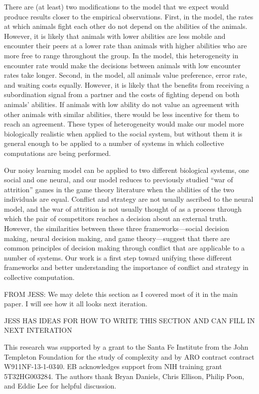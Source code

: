 \documentclass{pnastwo}
\begin{document}
\begin{article}
There are (at least) two modifications to the model that we expect would produce results closer to the empirical observations.  First, in the model, the rates at which animals fight each other do not depend on the abilities of the animals.  However, it is likely that animals with lower abilities are less mobile and encounter their peers at a lower rate than animals with higher abilities who are more free to range throughout the group.  In the model, this heterogeneity in encounter rate would make the decisions between animals with low encounter rates take longer.  Second, in the model, all animals value preference, error rate, and waiting costs equally.  However, it is likely that the benefits from receiving a subordination signal from a partner and the costs of fighting depend on both animals' abilities.  If animals with low ability  do not value an agreement with other animals with similar abilities, there would be less incentive for them to reach an agreement.  These types of heterogeneity would make our model more biologically realistic when applied to the social system, but without them it is general enough to be applied to a number of systems in which collective computations are being performed.  

Our noisy learning model can be applied to two different biological systems, one social and one neural, and our model reduces to previously studied ``war of attrition'' games in the game theory literature when the abilities of the two individuals are equal.  Conflict and strategy are not usually ascribed to the neural model, and the war of attrition is not usually thought of as a process through which the pair of competitors reaches a decision about an external truth.  However, the similarities between these three frameworks---social decision making, neural decision making, and game theory---suggest that there are common principles of decision making through conflict that are applicable to a number of systems.  Our work is a first step toward unifying these different frameworks and better understanding the importance of conflict and strategy in collective computation. 

%
 \label{empirical}
FROM JESS: We may delete this section as I covered most of it in the main paper. I will see how it all looks next iteration.


JESS HAS IDEAS FOR HOW TO WRITE THIS SECTION AND CAN FILL IN NEXT INTERATION

\begin{acknowledgments}
This research was supported by a grant to the Santa Fe Institute from the John Templeton Foundation for the study of complexity and by ARO contract contract W911NF-13-1-0340. EB acknowledges support from NIH training grant 5T32HG003284. The authors thank Bryan Daniels, Chris Ellison, Philip Poon, and Eddie Lee for helpful discussion. 
\end{acknowledgments}


\end{article}
\end{document}
